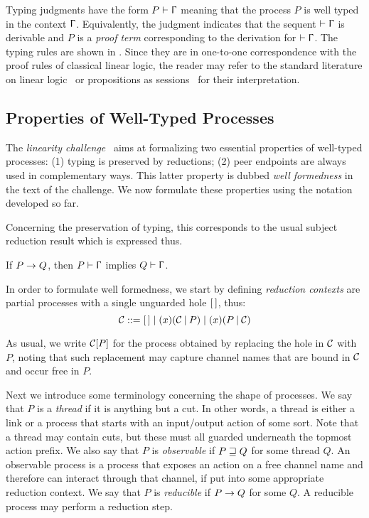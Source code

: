 Typing judgments have the form $\wtp{P}\Context$ meaning that the process $P$ is
well typed in the context $\Upgamma$. Equivalently, the judgment indicates that
the sequent $\wtp{}\Context$ is derivable and $P$ is a \emph{proof term}
corresponding to the derivation for $\wtp{}\Context$.
%
The typing rules are shown in . Since they are in
one-to-one correspondence with the proof rules of classical linear logic, the
reader may refer to the standard literature on linear logic~\cite{} or
propositions as sessions~\citep{Wadler14} for their interpretation.

\subsection{Properties of Well-Typed Processes}
\label{sec:properties}

The \emph{linearity challenge}~\citep{CarboneEtAl24} aims at formalizing two
essential properties of well-typed processes: (1) typing is preserved by
reductions; (2) peer endpoints are always used in complementary ways. This
latter property is dubbed \emph{well formedness} in the text of the challenge.
We now formulate these properties using the notation developed so far.

Concerning the preservation of typing, this corresponds to the usual subject
reduction result which is expressed thus.

\begin{theorem}
    \label{thm:red}
    If $P \rightarrow Q$, then $\wtp{P}\Context$ implies $\wtp{Q}\Context$.
\end{theorem}

In order to formulate well formedness, we start by defining \emph{reduction
contexts} are partial processes with a single unguarded hole $[\,]$, thus:
\[
    \mathcal{C} ::= [\,] \mid (x)(\mathcal{C}\mathbin| P) \mid (x)(P\mathbin|\mathcal{C})
\]

As usual, we write $\mathcal{C}[P]$ for the process obtained by replacing
the hole in $\mathcal{C}$ with $P$, noting that such replacement may
capture channel names that are bound in $\mathcal{C}$ and occur free in
$P$.

Next we introduce some terminology concerning the shape of processes. We say
that $P$ is a \emph{thread} if it is anything but a cut. In other words, a
thread is either a link or a process that starts with an input/output action of
some sort. Note that a thread may contain cuts, but these must all guarded
underneath the topmost action prefix.
%
We also say that $P$ is \emph{observable} if $P \sqsupseteq Q$ for some thread $Q$.
An observable process is a process that exposes an action on a free channel name
and therefore can interact through that channel, if put into some appropriate
reduction context. We say that $P$ is \emph{reducible} if $P \rightarrow Q$ for some
$Q$. A reducible process may perform a reduction step.

